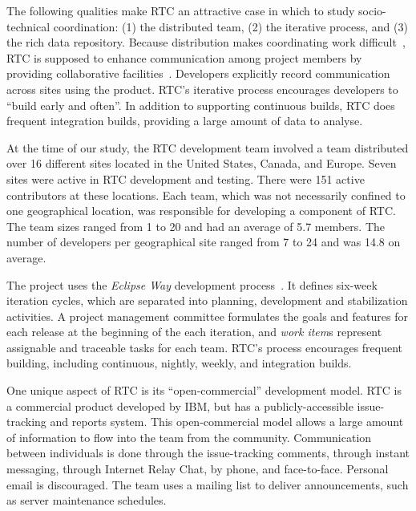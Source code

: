 The following qualities make RTC an attractive case in which to study
socio-technical coordination: (1) the distributed team, (2) the iterative
process, and (3) the rich data repository. Because distribution makes coordinating work difficult~\cite{hinds:cscw:2006,herbsleb2003:speed}, RTC is supposed to enhance communication among project members by providing collaborative facilities~\cite{frost:ieeesoftware:2007}. Developers explicitly record communication across sites using the product.
RTC's iterative process encourages developers to ``build early and often''. In addition to supporting continuous builds, RTC does frequent integration builds, providing a large amount of data to analyse.

At the time of our study, the RTC development team involved a team distributed over 16
different sites located in the United States, Canada, and Europe. Seven sites were
active in RTC development and testing. There were 151 active contributors
at these locations. Each team, which was not necessarily confined to one geographical location,
was responsible for developing a component of RTC.
The team sizes ranged from 1 to 20 and had an average of 5.7 members. The number
of developers per geographical site ranged from 7 to 24 and was 14.8 on average.

The project uses the \emph{Eclipse Way} development process~\cite{frost:ieeesoftware:2007}.
It defines six-week iteration cycles, which are separated into planning,
development and stabilization activities. A project management committee
formulates the goals and features for each release at the beginning of the each
iteration, and \emph{work item}s represent assignable and traceable tasks for each
team. RTC's process encourages frequent building, including continuous, nightly, weekly, and integration builds.

One unique aspect of RTC is its ``open-commercial'' development model. RTC is a commercial product developed by IBM, but has a publicly-accessible issue-tracking and reports system. This open-commercial model allows a large amount of information to flow into the team from the community.
Communication between individuals is done through the issue-tracking comments, through instant messaging, through Internet Relay Chat, by phone, and face-to-face. Personal email is discouraged. The team uses a mailing list to deliver announcements, such as server maintenance schedules. 







